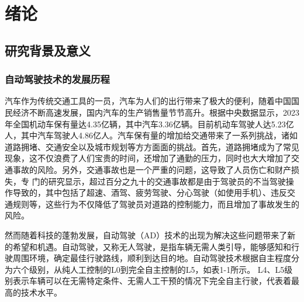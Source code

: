 \chapter{绪论}



\section{研究背景及意义}

\subsection{自动驾驶技术的发展历程}

汽车作为传统交通工具的一员，汽车为人们的出行带来了极大的便利，随着中国国民经济不断高速发展，国内汽车的生产销售量节节高升。根据中央数据显示，2023年全国机动车保有量达4.35亿辆，其中汽车3.36亿辆。目前机动车驾驶人达5.23亿人，其中汽车驾驶人4.86亿人。汽车保有量的增加给交通带来了一系列挑战，诸如道路拥堵、交通安全以及城市规划等方方面面的挑战。首先，道路拥堵成为了常见现象，这不仅浪费了人们宝贵的时间，还增加了通勤的压力，同时也大大增加了交通事故的风险。另外，交通事故也是一个严重的问题，这导致了人员伤亡和财产损失，专
门的研究显示，超过百分之九十的交通事故都是由于驾驶员的不当驾驶操作导致的，其中包括了超速、酒驾、疲劳驾驶、分心驾驶（如使用手机）、违反交通规则等，这些行为不仅降低了驾驶员对道路的控制能力\cite{关鑫2023自动驾驶安全挑战}，而且增加了事故发生的风险。

然而随着科技的蓬勃发展，自动驾驶（AD）技术的出现为解决这些问题带来了新的希望和机遇。自动驾驶，又称无人驾驶，是指车辆无需人类引导，能够感知和行驶周围环境，确定最佳行驶路线，顺利到达目的地。自动驾驶技术根据自主程度分为六个级别，从纯人工控制的L0到完全自主控制的L5，如表1-1所示。 L4、L5级别表示车辆可以在无需特定条件、无需人工干预的情况下完全自主行驶，代表着最高的技术水平\cite{1023549446.nh}。



